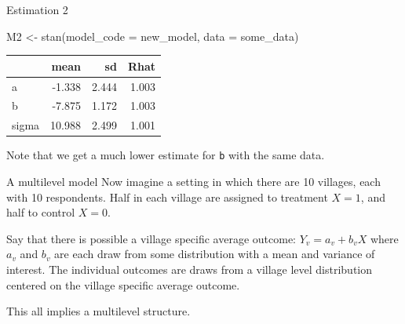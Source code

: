 \documentclass[
  11pt,
  ignorenonframetext,
]{beamer}
\newenvironment{Shaded}{\begin{snugshade}}{\end{snugshade}}
\newcommand{\AttributeTok}[1]{\textcolor[rgb]{0.40,0.45,0.13}{#1}}
\newcommand{\FunctionTok}[1]{\textcolor[rgb]{0.28,0.35,0.67}{#1}}
\newcommand{\NormalTok}[1]{\textcolor[rgb]{0.00,0.23,0.31}{#1}}
\newcommand{\OtherTok}[1]{\textcolor[rgb]{0.00,0.23,0.31}{#1}}
\begin{document}
\begin{frame}[fragile]{Estimation 2}
\protect\hypertarget{estimation-2}{}
\begin{Shaded}
\begin{Highlighting}[]
\NormalTok{M2 }\OtherTok{\textless{}{-}} \FunctionTok{stan}\NormalTok{(}\AttributeTok{model\_code =}\NormalTok{ new\_model, }\AttributeTok{data =}\NormalTok{ some\_data)}
\end{Highlighting}
\end{Shaded}

\begin{tabular}{l|r|r|r}
\hline
  & mean & sd & Rhat\\
\hline
a & -1.338 & 2.444 & 1.003\\
\hline
b & -7.875 & 1.172 & 1.003\\
\hline
sigma & 10.988 & 2.499 & 1.001\\
\hline
\end{tabular}

Note that we get a much lower estimate for \texttt{b} with the same
data.
\end{frame}

\begin{frame}{A multilevel model}
\protect\hypertarget{a-multilevel-model}{}
Now imagine a setting in which there are 10 villages, each with 10
respondents. Half in each village are assigned to treatment \(X=1\), and
half to control \(X=0\).

Say that there is possible a village specific average outcome:
\(Y_v = a_v + b_vX\) where \(a_v\) and \(b_v\) are each draw from some
distribution with a mean and variance of interest. The individual
outcomes are draws from a village level distribution centered on the
village specific average outcome.

This all implies a multilevel structure.
\end{frame}
\end{document}
